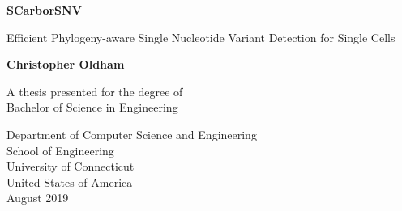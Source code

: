 \begin{titlepage}
   \begin{center}
       \vspace*{1cm}
 
       \Huge
       \textbf{SCarborSNV}
 
       \LARGE
       \vspace{0.5cm}
       Efficient Phylogeny-aware Single Nucleotide Variant Detection for Single Cells
 
       \vspace{1.5cm}
 
       \textbf{Christopher Oldham}
 
       \vfill
 
       \Large
       A thesis presented for the degree of\\
       Bachelor of Science in Engineering
 
       \vspace{0.8cm}
 
 
       Department of Computer Science and Engineering\\
       School of Engineering\\
       University of Connecticut\\
       United States of America\\
       August 2019
 
   \end{center}
\end{titlepage}

